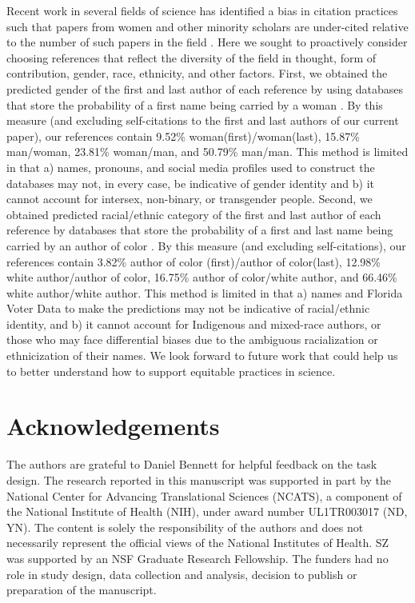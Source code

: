 \documentclass[a4paper,12pt]{article}
\begin{document}
\begin{refsection}[main]
Recent work in several fields of science has identified a bias in citation practices such that papers from women and other minority scholars are under-cited relative to the number of such papers in the field \cite{dworkin2020extent, bertolero2020racial}. Here we sought to proactively consider choosing references that reflect the diversity of the field in thought, form of contribution, gender, race, ethnicity, and other factors. First, we obtained the predicted gender of the first and last author of each reference by using databases that store the probability of a first name being carried by a woman \cite{dworkin2020extent}. By this measure (and excluding self-citations to the first and last authors of our current paper), our references contain 9.52\% woman(first)/woman(last), 15.87\% man/woman, 23.81\% woman/man, and 50.79\% man/man. This method is limited in that a) names, pronouns, and social media profiles used to construct the databases may not, in every case, be indicative of gender identity and b) it cannot account for intersex, non-binary, or transgender people. Second, we obtained predicted racial/ethnic category of the first and last author of each reference by databases that store the probability of a first and last name being carried by an author of color \cite{ambekar2009name, sood2018predicting}. By this measure (and excluding self-citations), our references contain 3.82\% author of color (first)/author of color(last), 12.98\% white author/author of color, 16.75\% author of color/white author, and 66.46\% white author/white author. This method is limited in that a) names and Florida Voter Data to make the predictions may not be indicative of racial/ethnic identity, and b) it cannot account for Indigenous and mixed-race authors, or those who may face differential biases due to the ambiguous racialization or ethnicization of their names. We look forward to future work that could help us to better understand how to support equitable practices in science.

\section*{Acknowledgements}

The authors are grateful to Daniel Bennett for helpful feedback on the task design. The research reported in this manuscript was supported in part by the National Center for Advancing Translational Sciences (NCATS), a component of the National Institute of Health (NIH), under award number UL1TR003017 (ND, YN). The content is solely the responsibility of the authors and does not necessarily represent the official views of the National Institutes of Health. SZ was supported by an NSF Graduate Research Fellowship. The funders had no role in study design, data collection and analysis, decision to publish or preparation of the manuscript.


\end{refsection}
\end{document}
